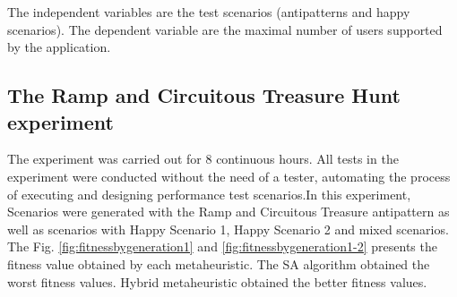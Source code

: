 The independent variables are the test scenarios (antipatterns and happy scenarios). The dependent variable are the maximal number of users supported by the application.

\subsection{The Ramp and Circuitous Treasure Hunt experiment}

The experiment was carried out for 8 continuous hours.  All tests in the experiment were conducted without the need of a tester, automating the process of executing and designing performance test scenarios.In this experiment, Scenarios were generated with the Ramp and Circuitous Treasure antipattern as well as scenarios with Happy Scenario 1, Happy Scenario 2 and mixed scenarios. The Fig. \ref{fig:fitnessbygeneration1} and \ref{fig:fitnessbygeneration1-2} presents the fitness value obtained by each metaheuristic. The SA algorithm obtained the worst fitness values. Hybrid metaheuristic obtained the better fitness values. 


